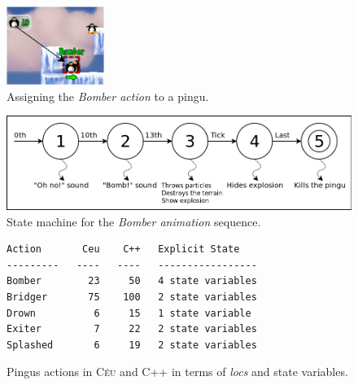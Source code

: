 \documentclass{vgtc}                          %
\newcommand{\CEU}{\textsc{C\'{e}u}\xspace}
\newcommand{\locs}{\emph{locs}\xspace}
\begin{document}

\begin{figure}[t]
\centering
\includegraphics[width=120px]{bomber-01}
\caption{ Assigning the \emph{Bomber action} to a pingu.
\label{fig.bomber.action}
}
\end{figure}

\begin{figure}[t]
\centering
\includegraphics[width=\columnwidth]{states}
\caption{ State machine for the \emph{Bomber animation} sequence.
\label{fig.bomber.fsm}
}
\end{figure}

\begin{figure}[t]
\begin{verbatim}
Action       Ceu    C++   Explicit State
---------   ----   ----   -----------------
Bomber        23     50   4 state variables
Bridger       75    100   2 state variables
Drown          6     15   1 state variable
Exiter         7     22   2 state variables
Splashed       6     19   2 state variables
\end{verbatim}
\caption{Pingus actions in \CEU and C++ in terms of \locs and state variables.
\label{tab.actions}
}
\end{figure}
\end{document}
